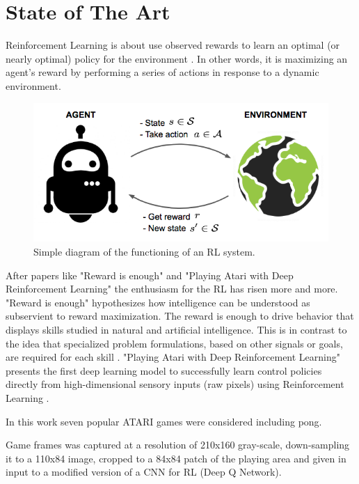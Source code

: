 \section{State of The Art}

Reinforcement Learning is about use observed rewards to learn an optimal (or nearly optimal) 
policy for the environment \cite{russell2002artificial}. In other words, it is maximizing an 
agent's reward by performing a series of actions in response to a dynamic environment.

\begin{figure}[ht]
    \centering
    \includegraphics[scale=0.4]{images/RL_illustration.png}
    \caption{Simple diagram of the functioning of an RL system.}
    \label{fig:RL_illustration}
\end{figure}

After papers like "Reward is enough"\cite{silver2021reward} and "Playing Atari with Deep Reinforcement Learning"\cite{mnih2013playing} the enthusiasm for the RL has risen more and more. 
"Reward is enough" hypothesizes how intelligence can be understood as subservient to reward maximization. The reward is enough to drive behavior that displays skills studied in natural and artificial intelligence. This is in contrast to the idea that specialized problem formulations, based on other signals or goals, are required for each skill \cite{silver2021reward}.
"Playing Atari with Deep Reinforcement Learning" presents the first deep learning model to successfully learn control policies directly from high-dimensional sensory inputs (raw pixels) using Reinforcement Learning \cite{mnih2013playing}.




In this work seven popular ATARI games were considered including pong.

Game frames was captured at a resolution of 210x160 gray-scale, down-sampling it to a 110x84 image, cropped to a 84x84 patch of the playing area
and given in input to a modified version of a CNN for RL (Deep Q Network).

